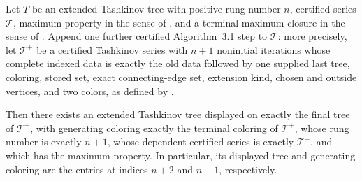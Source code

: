 \begin{lemma}
Let \(T\) be an extended Tashkinov tree with positive rung number \(n\),
certified series \(\mathcal T\), maximum property in the sense of
, and a terminal maximum closure in the sense of
.  Append one further certified
Algorithm~3.1 step to \(\mathcal T\): more precisely, let
\(\mathcal T^+\) be a certified Tashkinov series with \(n+1\) noninitial
iterations whose complete indexed data is exactly the old data followed by
one supplied last tree, coloring, stored set, exact connecting-edge set,
extension kind, chosen and outside vertices, and two colors, as defined by
.

Then there exists an extended Tashkinov tree displayed on exactly the final
tree of \(\mathcal T^+\), with generating coloring exactly the terminal
coloring of \(\mathcal T^+\), whose rung number is exactly \(n+1\), whose
dependent certified series is exactly \(\mathcal T^+\), and which has the
maximum property.  In particular, its displayed tree and generating coloring
are the entries at indices \(n+2\) and \(n+1\), respectively.
\end{lemma}
